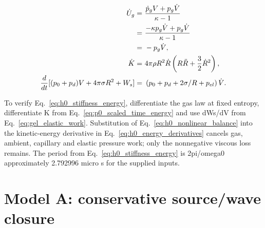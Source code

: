 \documentclass[11pt]{article}
\begin{document}
\begin{align}
\dot U_g= & ~\frac{\dot p_gV+p_g\dot V}{\kappa-1} \notag \\
= & ~\frac{-\kappa p_g\dot V+p_g\dot V}{\kappa-1} \notag \\
= & ~-p_g\dot V, \notag \\
\dot K= & ~4\pi\rho R^2\dot R\left(R\ddot R+\frac32\dot R^2\right), \notag \\
\frac{d}{dt}[(p_0+p_d)V+4\pi\sigma R^2+W_s]= & ~\left(p_0+p_d+2\sigma/R+p_{el}\right)\dot V. \label{eq:h0_energy_derivatives}
\end{align}

To verify Eq.~\eqref{eq:h0_stiffness_energy}, differentiate the gas law at fixed entropy, differentiate K from Eq.~\eqref{eq:p0_scaled_time_energy} and use dWs/dV from Eq.~\eqref{eq:gel_elastic_work}. Substitution of Eq.~\eqref{eq:h0_nonlinear_balance} into the kinetic-energy derivative in Eq.~\eqref{eq:h0_energy_derivatives} cancels gas, ambient, capillary and elastic pressure work; only the nonnegative viscous loss remains. The period from Eq.~\eqref{eq:h0_stiffness_energy} is 2pi/omega0 approximately 2.792996  micro s for the supplied inputs.

\section{Model A: conservative source/wave closure}\label{sec:a-wave}
\end{document}

